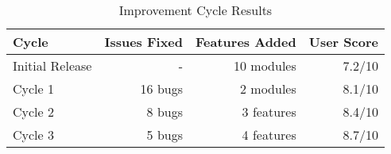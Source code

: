 \begin{table}[H]
\centering
\caption{Improvement Cycle Results}
\label{tab:improvement-cycles}
\begin{tabular}{@{}lrrr@{}}
\toprule
\textbf{Cycle} & \textbf{Issues Fixed} & \textbf{Features Added} & \textbf{User Score} \\
\midrule
Initial Release & - & 10 modules & 7.2/10 \\
Cycle 1 & 16 bugs & 2 modules & 8.1/10 \\
Cycle 2 & 8 bugs & 3 features & 8.4/10 \\
Cycle 3 & 5 bugs & 4 features & 8.7/10 \\
\bottomrule
\end{tabular}
\end{table}